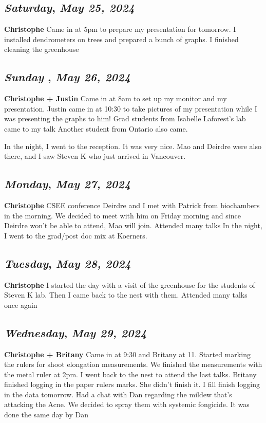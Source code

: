 \def\day{\textit{May 25, 2024}}
\def\weekday{\textit{Saturday}}
\subsection*{\weekday, \day}
\textbf{Christophe}
Came in at 5pm to prepare my presentation for tomorrow. 
I installed dendrometers on trees and prepared a bunch of graphs.
I finished cleaning the greenhouse

\def\day{\textit{May 26, 2024}}
\def\weekday{\textit{Sunday }}
\subsection*{\weekday, \day}
\textbf{Christophe + Justin}
Came in at 8am to set up my monitor and my presentation.
Justin came in at 10:30 to take pictures of my presentation while I was presenting the graphs to him! 
Grad students from Isabelle Laforest's lab came to my talk
Another student from Ontario also came. 

In the night, I went to the reception. It was very nice. Mao and Deirdre were also there, and I saw Steven K who just arrived in Vancouver. 
\def\day{\textit{May 27, 2024}}
\def\weekday{\textit{Monday}}
\subsection*{\weekday, \day}
\textbf{Christophe}
CSEE conference
Deirdre and I met with Patrick from biochambers in the morning. We decided to meet with him on Friday morning and since Deirdre won't be able to attend, Mao will join. 
Attended many talks
In the night, I went to the grad/post doc mix at Koerners. 
\def\day{\textit{May 28, 2024}}
\def\weekday{\textit{Tuesday}}
\subsection*{\weekday, \day}
\textbf{Christophe} 
I started the day with a visit of the greenhouse for the students of Steven K lab. Then I came back to the nest with them.
Attended many talks once again

\def\day{\textit{May 29, 2024}}
\def\weekday{\textit{Wednesday}}
\subsection*{\weekday, \day}
\textbf{Christophe + Britany}
Came in at 9:30 and Britany at 11.
Started marking the rulers for shoot elongation measurements. We finished the measurements with the metal ruler at 2pm. I went back to the nest to attend the last talks. Britany finished logging in the paper rulers marks. She didn't finish it. I fill finish logging in the data tomorrow. Had a chat with Dan regarding the mildew that's attacking the Acne. We decided to spray them with systemic fongicide. It was done the same day by Dan

